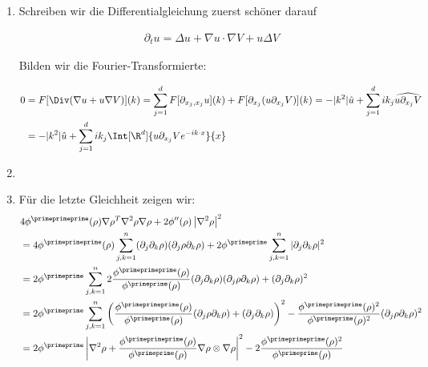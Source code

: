 
\begin{solution}

\phantom{}
\begin{enumerate}[label = (\roman*)]
  \item Schreiben wir die Differentialgleichung zuerst schöner darauf

  \begin{align*}
    \partial_t u
    =
    \Delta u + \nabla u \cdot \nabla V + u \Delta V
  \end{align*}

  Bilden wir die Fourier-Transformierte:

  \begin{align*}
    0
    &=
    F[\Div(\nabla u + u \nabla V)](k)
    =
    \sum_{j = 1}^d F[\partial_{x_j,x_j}u](k) +  F[\partial_{x_j}(u \partial_{x_j}V)](k)
    =
    -|k^2| \hat{u} + \sum_{j = 1}^d i k_j \widehat{u \partial_{x_j}V} \\
    &=
    -|k^2| \hat{u} + \sum_{j = 1}^d i k_j
    \Int[\R^d]{
      u \partial_{x_j}V e^{-ik \cdot x}
    }{x}
  \end{align*}
  \item
  \item Für die letzte Gleichheit zeigen wir:
  \begin{align*}
  &4\phi^{\primeprimeprime}(\rho) \nabla \rho^{T} \nabla^{2} \rho \nabla \rho+2
  \phi^{\prime \prime}(\rho)\left|\nabla^{2} \rho\right|^{2} \\
  &= 4\phi^{\primeprimeprime}(\rho)\sum_{j,k=1}^n(\partial_j\partial_k\rho)(\partial_j\rho\partial_k\rho) +
  2\phi^{\primeprime}\sum_{j,k=1}^n |\partial_j\partial_k\rho|^2 \\
  &= 2\phi^{\primeprime}\sum_{j,k=1}^n 2\frac{\phi^{\primeprimeprime}(\rho)}{\phi^{\primeprime}(\rho)}
  (\partial_j\partial_k\rho)(\partial_j\rho\partial_k\rho)+(\partial_j\partial_k\rho)^2 \\
  &= 2\phi^{\primeprime}\sum_{j,k=1}^n \left(\frac{\phi^{\primeprimeprime}(\rho)}{\phi^{\primeprime}(\rho)}
  (\partial_j\rho\partial_k\rho)+(\partial_j\partial_k\rho)\right)^2 - \frac{\phi^{\primeprimeprime}(\rho)^2}{\phi^{\primeprime}(\rho)^2}
  (\partial_j\rho\partial_k\rho)^2\\
  &= 2\phi^{\primeprime}\left|\nabla^2\rho +
  \frac{\phi^{\primeprimeprime}(\rho)}{\phi^{\primeprime}(\rho)} \nabla\rho \otimes
  \nabla \rho \right|^2 -
   2\frac{\phi^{\primeprimeprime}(\rho)^2}{\phi^{\primeprime}(\rho)}

\end{align*}
\end{enumerate}
\end{solution}
